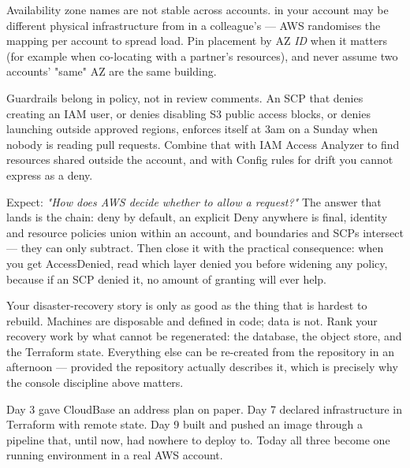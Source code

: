 \begin{infranote}
Availability zone names are not stable across accounts.  in your account may be different physical infrastructure from  in a colleague's --- AWS randomises the mapping per account to spread load. Pin placement by AZ \emph{ID} when it matters (for example when co-locating with a partner's resources), and never assume two accounts' "same" AZ are the same building.
\end{infranote}

\begin{autotip}
Guardrails belong in policy, not in review comments. An SCP that denies creating an IAM user, or denies disabling S3 public access blocks, or denies launching outside approved regions, enforces itself at 3am on a Sunday when nobody is reading pull requests. Combine that with IAM Access Analyzer to find resources shared outside the account, and with Config rules for drift you cannot express as a deny.
\end{autotip}

\begin{interview}
Expect: \emph{"How does AWS decide whether to allow a request?"} The answer that lands is the chain: deny by default, an explicit Deny anywhere is final, identity and resource policies union within an account, and boundaries and SCPs intersect --- they can only subtract. Then close it with the practical consequence: when you get AccessDenied, read which layer denied you before widening any policy, because if an SCP denied it, no amount of granting will ever help.
\end{interview}

\begin{drtip}
Your disaster-recovery story is only as good as the thing that is hardest to rebuild. Machines are disposable and defined in code; data is not. Rank your recovery work by what cannot be regenerated: the database, the object store, and the Terraform state. Everything else can be re-created from the repository in an afternoon --- provided the repository actually describes it, which is precisely why the console discipline above matters.
\end{drtip}


Day 3 gave CloudBase an address plan on paper. Day 7 declared infrastructure in Terraform with remote state. Day 9 built and pushed an image through a pipeline that, until now, had nowhere to deploy to. Today all three become one running environment in a real AWS account.

